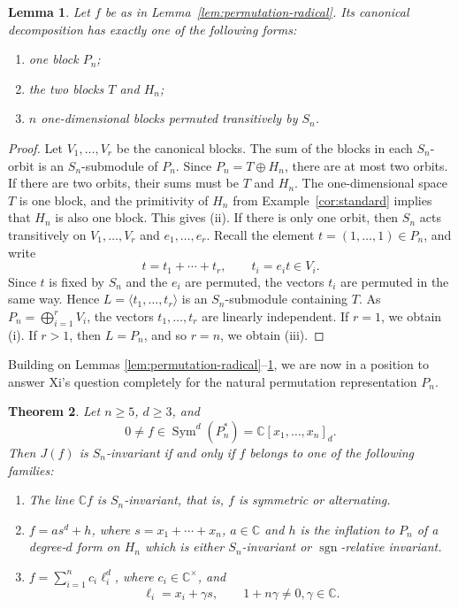 \documentclass[11pt,reqno]{amsart}
\numberwithin{equation}{section}
\newtheorem{theorem}{Theorem}[section]
\newtheorem{lemma}[theorem]{Lemma}
\theoremstyle{definition}
\theoremstyle{remark}
\newcommand{\C}{\mathbb C}
\newcommand{\Sym}{\operatorname{Sym}}
\newcommand{\sgn}{\operatorname{sgn}}
\begin{document}
\begin{lemma}\label{lem:permutation-blocks}
Let $f$ be as in Lemma~\ref{lem:permutation-radical}.  Its canonical
decomposition has exactly one of the following forms:
\begin{enumerate}[label=\textup{(\roman*)},leftmargin=0.9cm]
\item one block $P_n$;
\item the two blocks $T$ and $H_n$;
\item $n$ one-dimensional blocks permuted transitively by $S_n$.
\end{enumerate}
\end{lemma}

\begin{proof}
Let $V_1,\ldots,V_r$ be the canonical blocks.  The sum of the blocks
in each $S_n$-orbit is an $S_n$-submodule of $P_n$.   Since $P_n=T\oplus H_n$, there are at most two orbits. If there are two orbits, their sums must be $T$ and $H_n$.  The
one-dimensional space $T$ is one block, and the primitivity of $H_n$
from Example~\ref{cor:standard} implies that $H_n$ is also one
block.  This gives \textup{(ii)}. If there is only one orbit, then $S_n$ acts transitively on 
$V_1,\ldots,V_r$ and $e_1,\ldots,e_r$.  Recall the element $t=(1,\dots,1)\in P_n$, and write
\[
  t=t_1+\cdots+t_r,
  \qquad
  t_i=e_it\in V_i.
\]
Since $t$ is fixed by $S_n$ and the $e_i$ are permuted,
the vectors $t_i$ are permuted in the same way. Hence $  L=\langle t_1,\ldots,t_r\rangle$ is an $S_n$-submodule containing $T$.  As $ P_n=\bigoplus_{i=1}^r V_i$, the vectors $t_1,\ldots,t_r$ are linearly independent.  If $r=1$, we obtain \textup{(i)}.  If $r>1$, then $L=P_n$, and so $r=n$, we obtain \textup{(iii)}.
\end{proof}


Building on Lemmas \ref{lem:permutation-radical}--\ref{lem:permutation-blocks}, we are now in a position to answer Xi's question completely for the
natural permutation representation $P_n$. 

\begin{theorem}
\label{thm:permutation-classification}
Let $n\geq5$, $d\geq3$, and
\[
 0\neq f\in\Sym^d(P_n^*)= \C[x_1,\ldots,x_n]_d.
\]
Then $J(f)$ is $S_n$-invariant if and only if $f$ belongs
to one of the following families:
\begin{enumerate}[label=\textup{(\roman*)},leftmargin=0.9cm]
\item
The line $\C f$ is $S_n$-invariant, that is, $f$ is symmetric
or alternating.

\item $f=a s^d+h$, where $s=x_1+\cdots+x_n$,  $a\in\C$ and $h$ is the inflation to $P_n$ of a degree-$d$
form on $H_n$ which is either $S_n$-invariant or
$\sgn$-relative invariant.


\item  $f=\sum_{i=1}^n c_i\ell_i^d$, where $c_i\in\C^\times$, and
\begin{equation}\label{eq:permutation-linear-forms}
  \ell_i=x_i+\gamma s,
  \qquad
  1+n\gamma\ne0, \gamma\in \C.
\end{equation}
\end{enumerate}
\end{theorem}
\end{document}

